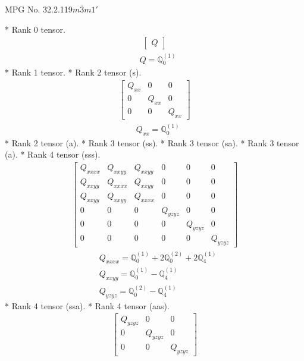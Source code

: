 \documentclass[fleqn,8pt,landscape]{jsarticle}
\begin{document}
\setcounter{MaxMatrixCols}{32}

\renewcommand{\tablename}{Table~}
\renewcommand{\figurename}{Figure~}
\begin{center}
\LARGE
MPG No. 32.2.119\quad$m\bar{3}m1'$
\end{center}
* Rank 0 tensor.
\begin{align*}
\begin{bmatrix} Q \end{bmatrix}
\end{align*}
\begin{align*}
& Q = \mathbb{Q}_{0}^{(1)}
\end{align*}
* Rank 1 tensor.
* Rank 2 tensor (s).
\begin{align*}
\begin{bmatrix} Q_{xx} & 0 & 0 \\ 0 & Q_{xx} & 0 \\ 0 & 0 & Q_{xx} \end{bmatrix}
\end{align*}
\begin{align*}
& Q_{xx} = \mathbb{Q}_{0}^{(1)}
\end{align*}
* Rank 2 tensor (a).
* Rank 3 tensor (ss).
* Rank 3 tensor (sa).
* Rank 3 tensor (a).
* Rank 4 tensor (sss).
\begin{align*}
\begin{bmatrix} Q_{xxxx} & Q_{xxyy} & Q_{xxyy} & 0 & 0 & 0 \\ Q_{xxyy} & Q_{xxxx} & Q_{xxyy} & 0 & 0 & 0 \\ Q_{xxyy} & Q_{xxyy} & Q_{xxxx} & 0 & 0 & 0 \\ 0 & 0 & 0 & Q_{yzyz} & 0 & 0 \\ 0 & 0 & 0 & 0 & Q_{yzyz} & 0 \\ 0 & 0 & 0 & 0 & 0 & Q_{yzyz} \end{bmatrix}
\end{align*}
\begin{align*}
& Q_{xxxx} = \mathbb{Q}_{0}^{(1)} + 2 \mathbb{Q}_{0}^{(2)} + 2 \mathbb{Q}_{4}^{(1)} \\
& Q_{xxyy} = \mathbb{Q}_{0}^{(1)} - \mathbb{Q}_{4}^{(1)} \\
& Q_{yzyz} = \mathbb{Q}_{0}^{(2)} - \mathbb{Q}_{4}^{(1)}
\end{align*}
* Rank 4 tensor (ssa).
* Rank 4 tensor (aas).
\begin{align*}
\begin{bmatrix} Q_{yzyz} & 0 & 0 \\ 0 & Q_{yzyz} & 0 \\ 0 & 0 & Q_{yzyz} \end{bmatrix}
\end{align*}
\end{document}
